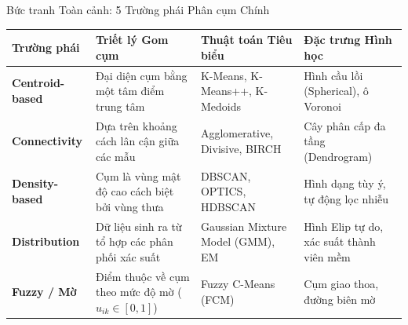 \documentclass[aspectratio=169,10pt]{beamer}
\begin{document}
\begin{frame}{Bức tranh Toàn cảnh: 5 Trường phái Phân cụm Chính}
  \begin{table}[]
    \scriptsize
    \centering
    \begin{tabularx}{\textwidth}{l p{2.6cm} p{2.6cm} X}
      \toprule
      \textbf{Trường phái} & \textbf{Triết lý Gom cụm} & \textbf{Thuật toán Tiêu biểu} & \textbf{Đặc trưng Hình học} \\
      \midrule
      \textbf{Centroid-based} & Đại diện cụm bằng một tâm điểm trung tâm & K-Means, K-Means++, K-Medoids & Hình cầu lồi (Spherical), ô Voronoi \\
      \addlinespace
      \textbf{Connectivity} & Dựa trên khoảng cách lân cận giữa các mẫu & Agglomerative, Divisive, BIRCH & Cây phân cấp đa tầng (Dendrogram) \\
      \addlinespace
      \textbf{Density-based} & Cụm là vùng mật độ cao cách biệt bởi vùng thưa & DBSCAN, OPTICS, HDBSCAN & Hình dạng tùy ý, tự động lọc nhiễu \\
      \addlinespace
      \textbf{Distribution} & Dữ liệu sinh ra từ tổ hợp các phân phối xác suất & Gaussian Mixture Model (GMM), EM & Hình Elip tự do, xác suất thành viên mềm \\
      \addlinespace
      \textbf{Fuzzy / Mờ} & Điểm thuộc về cụm theo mức độ mờ ($u_{ik} \in [0,1]$) & Fuzzy C-Means (FCM) & Cụm giao thoa, đường biên mờ \\
      \bottomrule
    \end{tabularx}
  \end{table}
\end{frame}
\end{document}
